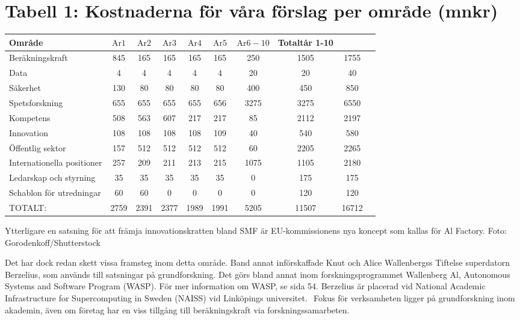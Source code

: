 {{{{{\section*{Tabell 1: Kostnaderna för våra förslag per område (mnkr)}
\begin{tabular}{lccccccccc}
\hline Område & \(\mathrm{Ar} 1\) & \(\mathrm{Ar} 2\) & \(\mathrm{Ar} 3\) & \(\mathrm{Ar} 4\) & \(\mathrm{Ar} 5\) & \(\mathrm{Ar} 6-10\) & Totaltår 1-10 & \\
\hline Beräkningskraft & 845 & 165 & 165 & 165 & 165 & 250 & 1505 & 1755 \\
\hline Data & 4 & 4 & 4 & 4 & 4 & 20 & 20 & 40 \\
\hline Säkerhet & 130 & 80 & 80 & 80 & 80 & 400 & 450 & 850 \\
\hline Spetsforskning & 655 & 655 & 655 & 655 & 656 & 3275 & 3275 & 6550 \\
\hline Kompetens & 508 & 563 & 607 & 217 & 217 & 85 & 2112 & 2197 \\
\hline Innovation & 108 & 108 & 108 & 108 & 109 & 40 & 540 & 580 \\
\hline Öffentlig sektor & 157 & 512 & 512 & 512 & 512 & 60 & 2205 & 2265 \\
\hline Internationella positioner & 257 & 209 & 211 & 213 & 215 & 1075 & 1105 & 2180 \\
\hline Ledarskap och styrning & 35 & 35 & 35 & 35 & 35 & 0 & 175 & 175 \\
\hline Schablon för utredningar & 60 & 60 & 0 & 0 & 0 & 0 & 120 & 120 \\
\hline TOTALT: & 2759 & 2391 & 2377 & 1989 & 1991 & 5205 & 11507 & 16712 \\
\hline
\end{tabular}

Ytterligare en satsning för att främja innovationskratten bland SMF är EU-kommissionens nya koncept som kallas för Al Factory. Foto: Gorodenkoff/Shutterstock

Det har dock redan skett vissa framsteg inom detta område. Band annat införskaffade Knut och Alice Wallenbergss Tiftelse superdatorn Berzelius, som används till satsningar på grundforskning. Det görs bland annat inom forskningsprogrammet Wallenberg Al, Autonomous Systems and Software Program (WASP). För mer information om WASP, se sida 54.
Berzelius är placerad vid National Academic Infrastructure for Supercomputing in Sweden (NAISS) vid Linköpings universitet. \({ }^{}\) Fokus för verksamheten ligger på grundforskning inom akademin, även om företag har en viss tillgång till beräkningskraft via forskningssamarbeten.
}}}}}
